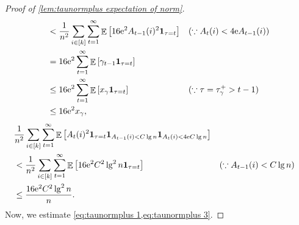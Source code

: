 \documentclass[letterpaper,11pt]{article}
\newcommand{\indicator}{\mathbf{1}}
\DeclareMathOperator*{\E}{\mathbb{E}}
\newcommand{\e}{\mathrm{e}}
\newcommand{\alphanorm}{\gamma}
\newcommand{\taunormplus}{\tau^{+}_{\alphanorm}}
\newcommand{\xnorm}{x_{\alphanorm}}
\begin{document}
\begin{proof}[Proof of \cref{lem:taunormplus expectation of norm}]
\begin{align*}
        &< \frac{1}{n^2}\sum_{i\in [k]}\sum_{t=1}^\infty\E\qty[16\e^2A_{t-1}(i)^2\indicator_{\tau=t}] & &(\because A_{t}(i)< 4\e A_{t-1}(i))\\
        &=16\e^2 \sum_{t=1}^\infty\E\qty[\alphanorm_{t-1}\indicator_{\tau=t}]\\
        &\leq 16\e^2 \sum_{t=1}^\infty\E\qty[\xnorm\indicator_{\tau=t}] & &(\because \tau=\taunormplus>t-1)\\
        &\leq 16\e^2\xnorm, 
    \end{align*}
    \begin{align*}
        &\frac{1}{n^2}\sum_{i\in [k]}\sum_{t=1}^\infty\E\qty[A_t(i)^2\indicator_{\tau=t}\indicator_{A_{t-1}(i)< C\lg n}\indicator_{A_{t}(i)<4\e C\lg n}]\\
        &< \frac{1}{n^2}\sum_{i\in [k]}\sum_{t=1}^\infty\E\qty[16\e^2C^2\lg^2n\indicator_{\tau=t}] & &(\because A_{t-1}(i)< C\lg n)\\
        &\leq \frac{16\e^2C^2\lg^2n}{n}.
    \end{align*}
    Now, we estimate \cref{eq:taunormplus 1,eq:taunormplus 3}.

\end{proof}
\end{document}
